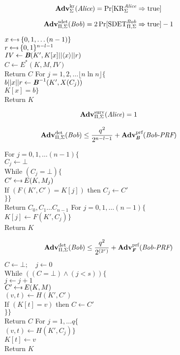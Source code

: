 $$\mathbf{Adv}^{\text{kr}}_{\Sigma} (\emph{Alice}) = \Pr[\mathrm{KR}_{\Sigma}^{\emph{Alice}}\Rightarrow \text{true}]$$

$$\mathbf{Adv}^{\text{sdet}}_{\Pi,\Sigma} (\emph{Bob}) = 2\Pr[\mathrm{SDET}_{\Pi,\Sigma}^{\emph{Bob}}\Rightarrow \text{true}]-1$$

\begin{figure}[h]
{
$x\getsr \{0,1,\dots (n-1)\}$\\
$r\getsr \bits^{n-l-1}$\\
$IV\gets \emph{\textbf{B}}(K',K[x]||\langle x\rangle||r)$\\
$C\gets E^*(K,M,IV)$\\
Return $C$
}
{
For $j=1,2,\dots \lfloor n\ln n\rfloor\{$\\
$b||x||r\gets \textbf{\emph{B}}^{-1}(K',X(C_j))$\\
$K[x]=b\}$\\
Return $K$
}
\end{figure}

$$\mathbf{Adv}^{\text{surv}}_{\Pi,\Sigma}(\emph{Alice}) = 1$$

$$\mathbf{Adv}^{\text{det}}_{\Pi,\Sigma}(\emph{Bob})\le \frac{q^2}{2^{n-l-1}}+\mathbf{Adv}^{\text{prf}}_{\emph{\textbf{B}}}(\emph{Bob-PRF})$$

\begin{figure}[h]
{
For $j=0,1,\dots (n-1)\{$\\
$C_j\gets \bot$\\
While $(C_j=\bot) \{$\\
$C'\getsr E(K,M_j)$\\
If $(F(K',C')=K[j])$ then $C_j\gets C'$\\
$\}\}$\\
Return $C_0,C_1\dots C_{n-1}$
}
{
For $j=0,1,\dots (n-1)\{$\\
$K[j]\gets F(K',C_j)\}$\\
Return $K$
}
\end{figure}

$$\mathbf{Adv}^{\text{det}}_{\Pi,\Sigma}(\emph{Bob})\le \frac{q^2}{2^{(2^r)}}+\mathbf{Adv}^{\text{prf}}_{\emph{\textbf{F}}}(\emph{Bob-PRF})$$

\begin{figure}[h]
{
$C\gets \bot;\quad j\gets 0$\\
While $((C=\bot) \land (j<s) ) \{$\\
$j\gets j+1$\\
$C'\getsr E(K,M)$\\
$(v,t)\gets H(K',C')$\\
If $(K[t]=v)$ then $C\gets C'$\\
$\}\}$\\
Return $C$
}
{
For $j=1,\dots q \{$\\
$(v,t)\gets H(K',C_j)\}$\\
$K[t]\gets v$\\
Return $K$
}
\end{figure}


